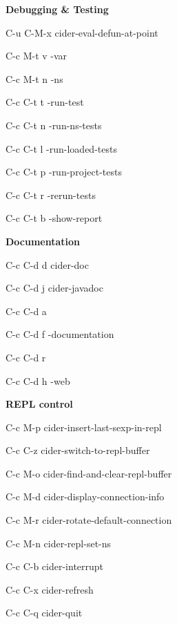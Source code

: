 \documentclass[a4paper,10pt]{article}
\renewcommand\section[1]{\bigskip\par\textbf{\large#1}\medskip}
\newcommand\keyify[1]{\keys{\ttfamily#1}}
\begin{document}
\begin{multicols}{2}
\columnbreak

\section{Debugging \& Testing}
\begin{keylist}[labelwidth=\widthof{\keyify{C-c C-d C-a}}]
\item[C-u C-M-x] cider-eval-defun-at-point
\item[C-c M-t v] -var
\item[C-c M-t n] \ns                    -ns
\item[C-c C-t t] -run-test
\item[C-c C-t n] \ns            -run-ns-tests
\item[C-c C-t l] \ns            -run-loaded-tests
\item[C-c C-t p] \ns            -run-project-tests
\item[C-c C-t r] \ns            -rerun-tests
\item[C-c C-t b] \ns            -show-report
\end{keylist}

\section{Documentation}
\begin{keylist}[labelwidth=\widthof{\keyify{C-c C-d C-a}}]
  \item[C-c C-d d] cider-doc
  \item[C-c C-d j] cider-javadoc
  \item[C-c C-d a] 
  \item[C-c C-d f] \ns               -documentation
  \item[C-c C-d r] 
  \item[C-c C-d h] \ns                -web
\end{keylist}

\section{REPL control}
\begin{keylist}[labelwidth=\widthof{\keyify{C-c M-c}}]
  \item[C-c M-p] cider-insert-last-sexp-in-repl
  \item[C-c C-z] cider-switch-to-repl-buffer
  \item[C-c M-o] cider-find-and-clear-repl-buffer
  \item[C-c M-d] cider-display-connection-info
  \item[C-c M-r] cider-rotate-default-connection
  \item[C-c M-n] cider-repl-set-ns
  \item[C-c C-b] cider-interrupt
  \item[C-c C-x] cider-refresh
  \item[C-c C-q] cider-quit
\end{keylist}
\end{multicols}
\end{document}
